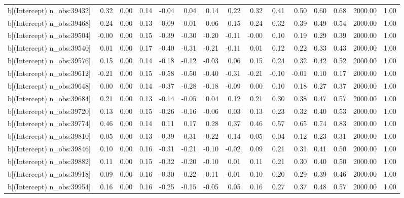 \begin{table}[ht]
\begin{tabular}{rrrrrrrrrrrrrrr}
  b[(Intercept) n\_obs:39432] & 0.32 & 0.00 & 0.14 & -0.04 & 0.04 & 0.14 & 0.22 & 0.32 & 0.41 & 0.50 & 0.60 & 0.68 & 2000.00 & 1.00 \\ 
  b[(Intercept) n\_obs:39468] & 0.24 & 0.00 & 0.13 & -0.09 & -0.01 & 0.06 & 0.15 & 0.24 & 0.32 & 0.39 & 0.49 & 0.54 & 2000.00 & 1.00 \\ 
  b[(Intercept) n\_obs:39504] & -0.00 & 0.00 & 0.15 & -0.39 & -0.30 & -0.20 & -0.11 & -0.00 & 0.10 & 0.19 & 0.29 & 0.39 & 2000.00 & 1.00 \\ 
  b[(Intercept) n\_obs:39540] & 0.01 & 0.00 & 0.17 & -0.40 & -0.31 & -0.21 & -0.11 & 0.01 & 0.12 & 0.22 & 0.33 & 0.43 & 2000.00 & 1.00 \\ 
  b[(Intercept) n\_obs:39576] & 0.15 & 0.00 & 0.14 & -0.18 & -0.12 & -0.03 & 0.06 & 0.15 & 0.24 & 0.32 & 0.42 & 0.52 & 2000.00 & 1.00 \\ 
  b[(Intercept) n\_obs:39612] & -0.21 & 0.00 & 0.15 & -0.58 & -0.50 & -0.40 & -0.31 & -0.21 & -0.10 & -0.01 & 0.10 & 0.17 & 2000.00 & 1.00 \\ 
  b[(Intercept) n\_obs:39648] & 0.00 & 0.00 & 0.14 & -0.37 & -0.28 & -0.18 & -0.09 & 0.00 & 0.10 & 0.18 & 0.27 & 0.37 & 2000.00 & 1.00 \\ 
  b[(Intercept) n\_obs:39684] & 0.21 & 0.00 & 0.13 & -0.14 & -0.05 & 0.04 & 0.12 & 0.21 & 0.30 & 0.38 & 0.47 & 0.57 & 2000.00 & 1.00 \\ 
  b[(Intercept) n\_obs:39720] & 0.13 & 0.00 & 0.15 & -0.26 & -0.16 & -0.06 & 0.03 & 0.13 & 0.23 & 0.32 & 0.40 & 0.53 & 2000.00 & 1.00 \\ 
  b[(Intercept) n\_obs:39774] & 0.46 & 0.00 & 0.14 & 0.11 & 0.17 & 0.28 & 0.37 & 0.46 & 0.57 & 0.65 & 0.74 & 0.83 & 2000.00 & 1.00 \\ 
  b[(Intercept) n\_obs:39810] & -0.05 & 0.00 & 0.13 & -0.39 & -0.31 & -0.22 & -0.14 & -0.05 & 0.04 & 0.12 & 0.23 & 0.31 & 2000.00 & 1.00 \\ 
  b[(Intercept) n\_obs:39846] & 0.10 & 0.00 & 0.16 & -0.31 & -0.21 & -0.10 & -0.02 & 0.09 & 0.21 & 0.31 & 0.41 & 0.50 & 2000.00 & 1.00 \\ 
  b[(Intercept) n\_obs:39882] & 0.11 & 0.00 & 0.15 & -0.32 & -0.20 & -0.10 & 0.01 & 0.11 & 0.21 & 0.30 & 0.40 & 0.50 & 2000.00 & 1.00 \\ 
  b[(Intercept) n\_obs:39918] & 0.09 & 0.00 & 0.16 & -0.30 & -0.22 & -0.11 & -0.01 & 0.10 & 0.20 & 0.29 & 0.39 & 0.46 & 2000.00 & 1.00 \\ 
  b[(Intercept) n\_obs:39954] & 0.16 & 0.00 & 0.16 & -0.25 & -0.15 & -0.05 & 0.05 & 0.16 & 0.27 & 0.37 & 0.48 & 0.57 & 2000.00 & 1.00 \\ 

\end{tabular}
\end{table}
